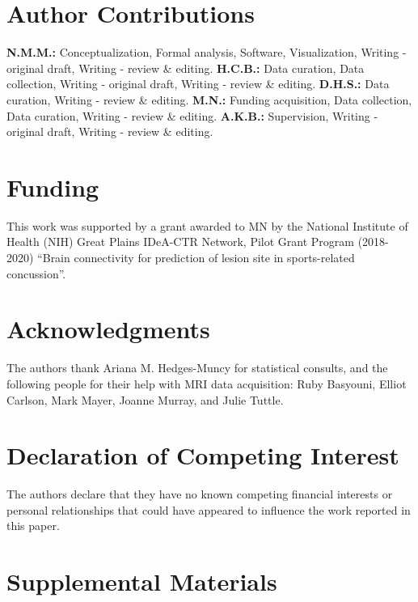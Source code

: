 \documentclass[12pt]{article}
\newcommand{\beginsupplement}{%
	\setcounter{table}{0}
	\renewcommand{\thetable}{S\arabic{table}}%
	\setcounter{figure}{0}
	\renewcommand{\thefigure}{S\arabic{figure}}%
}
\begin{document}
\section*{Author Contributions}
\label{sec:xtr-auth}
\textbf{N.M.M.:} Conceptualization, Formal analysis, Software, Visualization, Writing - original draft, Writing - review \& editing. \textbf{H.C.B.:} Data curation, Data collection, Writing - original draft, Writing - review \& editing. \textbf{D.H.S.:} Data curation, Writing - review \& editing. \textbf{M.N.:} Funding acquisition, Data collection, Data curation, Writing - review \& editing. \textbf{A.K.B.:} Supervision, Writing - original draft, Writing - review \& editing.


\section*{Funding}
\label{sec:xtr-fund}
This work was supported by a grant awarded to MN by the National Institute of Health (NIH) Great Plains IDeA-CTR Network, Pilot Grant Program (2018-2020) ``Brain connectivity for prediction of lesion site in sports-related concussion''.


\section*{Acknowledgments}
\label{sec:xtr-ack}
The authors thank Ariana M. Hedges-Muncy for statistical consults, and the following people for their help with MRI data acquisition: Ruby Basyouni, Elliot Carlson, Mark Mayer, Joanne Murray, and Julie Tuttle.


\section*{Declaration of Competing Interest}
\label{sec:xtr-dci}
The authors declare that they have no known competing financial interests or personal relationships that could have appeared to influence the work reported in this paper.


\pagebreak
\printbibliography
\pagebreak


\section{Supplemental Materials}
\label{sec:supp-materials}
\beginsupplement
\end{document}
